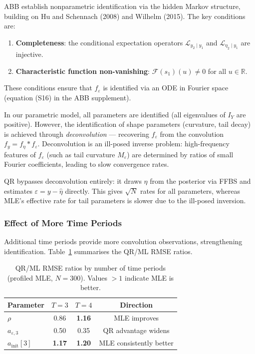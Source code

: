 \documentclass[12pt]{article}
\begin{document}
ABB establish nonparametric identification via the hidden Markov structure,
building on Hu and Schennach (2008) and Wilhelm (2015).
The key conditions are:
\begin{enumerate}
\item \textbf{Completeness}: the conditional expectation operators
  $\mathcal{L}_{y_2 \mid y_1}$ and $\mathcal{L}_{\eta_2 \mid y_1}$ are injective.
\item \textbf{Characteristic function non-vanishing}:
  $\mathcal{F}(s_1)(u) \neq 0$ for all $u \in \mathbb{R}$.
\end{enumerate}
These conditions ensure that $f_\varepsilon$ is identified via an ODE in
Fourier space (equation (S16) in the ABB supplement).

In our parametric model, all parameters are identified (all eigenvalues
of $I_Y$ are positive).
However, the identification of shape parameters (curvature, tail decay)
is achieved through \emph{deconvolution} --- recovering $f_\varepsilon$
from the convolution $f_y = f_\eta * f_\varepsilon$.
Deconvolution is an ill-posed inverse problem: high-frequency features
of $f_\varepsilon$ (such as tail curvature $M_\varepsilon$) are determined
by ratios of small Fourier coefficients, leading to slow convergence rates.

QR bypasses deconvolution entirely: it draws $\eta$ from the posterior
via FFBS and estimates $\varepsilon = y - \hat\eta$ directly.
This gives $\sqrt{N}$ rates for all parameters, whereas MLE's effective
rate for tail parameters is slower due to the ill-posed inversion.

\subsubsection*{Effect of More Time Periods}

Additional time periods provide more convolution observations, strengthening
identification.
Table~\ref{tab:T_comparison} summarises the QR/ML RMSE ratios.

\begin{table}[H]
\centering
\caption{QR/ML RMSE ratios by number of time periods (profiled MLE, $N = 300$).
Values $> 1$ indicate MLE is better.}
\label{tab:T_comparison}
\begin{tabular}{lccc}
\toprule
Parameter & $T = 3$ & $T = 4$ & Direction \\
\midrule
$\rho$ & 0.86 & \textbf{1.16} & MLE improves \\
$a_{\varepsilon,3}$ & 0.50 & 0.35 & QR advantage widens \\
$a_{\text{init}}[3]$ & \textbf{1.17} & \textbf{1.20} & MLE consistently better \\
\bottomrule
\end{tabular}
\end{table}
\end{document}
